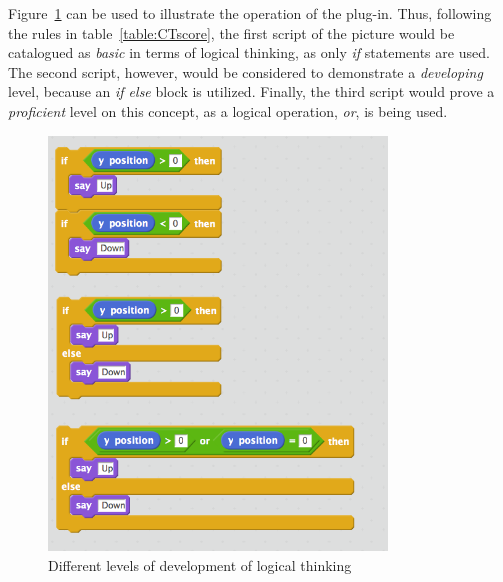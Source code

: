 \documentclass[a4paper,11pt]{article}
\begin{document}
Figure~\ref{fig:logic} can be used to illustrate the operation of the plug-in. Thus, following the rules in table~\ref{table:CTscore}, the first script of the picture would be catalogued as \textit{basic} in terms of logical thinking, as only \textit{if} statements are used. The second script, however, would be considered to demonstrate a \textit{developing} level, because an \textit{if else} block is utilized. Finally, the third script would prove a \textit{proficient} level on this concept, as a logical operation, \textit{or}, is being used.
\begin{figure}
  \centering
    \includegraphics[width=9cm]{img/Logic.png}
    \caption{Different levels of development of logical thinking}
    \label{fig:logic}
\end{figure}
\end{document}

